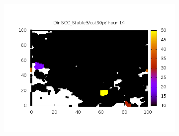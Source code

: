 \documentclass[10pt,a4paper]{article}
\begin{document}
\begin{figure}
\begin{subfigure}[b]{1\textwidth}
\includegraphics[scale=.20]{./img/SCC_Stable3/cut90p/14.png}
\end{subfigure}


\end{figure}
\end{document}
